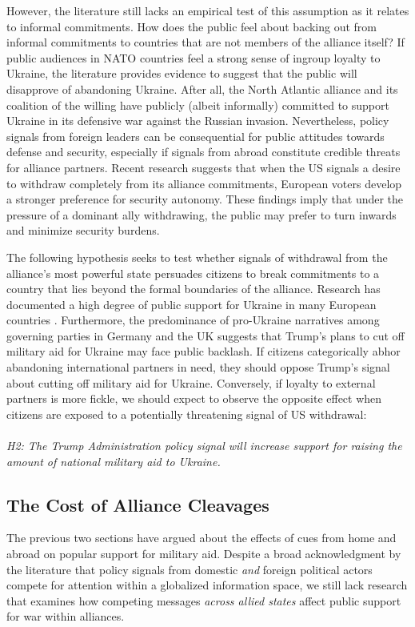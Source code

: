 However, the literature still lacks an empirical test of this assumption as it relates to informal commitments. How does the public feel about backing out from informal commitments to countries that are not members of the alliance itself? If public audiences in NATO countries feel a strong sense of ingroup loyalty to Ukraine, the literature provides evidence to suggest that the public will disapprove of abandoning Ukraine. After all, the North Atlantic alliance and its coalition of the willing have publicly (albeit informally) committed to support Ukraine in its defensive war against the Russian invasion. Nevertheless, policy signals from foreign leaders can be consequential for public attitudes towards defense and security, especially if signals from abroad constitute credible threats for alliance partners.\autocite{blankenship_price_2021, blankenship_threats_2024} Recent research suggests that when the US signals a desire to withdraw completely from its alliance commitments, European voters develop a stronger preference for security autonomy. \autocite{jakob_barrett_how_2026} These findings imply that under the pressure of a dominant ally withdrawing, the public may prefer to turn inwards and minimize security burdens. 

The following hypothesis seeks to test whether signals of withdrawal from the alliance's most powerful state persuades citizens to break commitments to a country that lies beyond the formal boundaries of the alliance. Research has documented a high degree of public support for Ukraine in many European countries \autocite{thomson_european_2023, mader_increased_2024}. Furthermore, the predominance of pro-Ukraine narratives among governing parties in Germany and the UK suggests that Trump's plans to cut off military aid for Ukraine may face public backlash. If citizens categorically abhor abandoning international partners in need, they should oppose Trump's signal about cutting off military aid for Ukraine. Conversely, if loyalty to external partners is more fickle, we should expect to observe the opposite effect when citizens are exposed to a potentially threatening signal of US withdrawal:
\paragraph{}
\textit{H2: The Trump Administration policy signal will increase support for raising the amount of national military aid to Ukraine.}

\subsection{The Cost of Alliance Cleavages}
The previous two sections have argued about the effects of cues from home and abroad on popular support for military aid. Despite a broad acknowledgment by the literature that policy signals from domestic \emph{and} foreign political actors compete for attention within a globalized information space, we still lack research that examines how competing messages \emph{across allied states} affect public support for war within alliances. 


